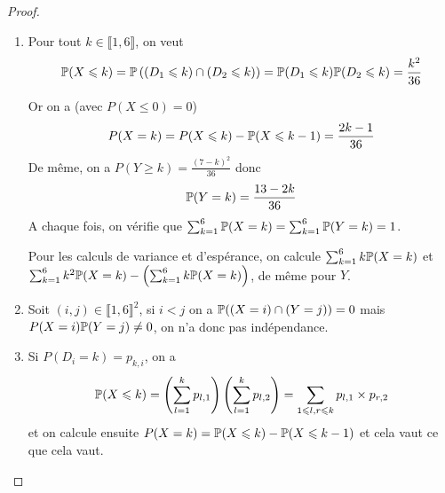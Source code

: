 \begin{proof}
    \phantom{}
    \begin{enumerate}
        \item Pour tout $k\in\llbracket1,6\rrbracket$, on veut
        \begin{equation}
            \P(X\leqslant k)=\P\left(\left(D_{1}\leqslant k\right)\cap\left(D_{2}\leqslant k\right)\right)=\P(D_{1}\leqslant k)\P(D_{2}\leqslant k)=\frac{k^{2}}{36}
        \end{equation}

        Or on a (avec $P(X\leqslant 0)=0$)
        \begin{equation}
            P(X=k)=P(X\leqslant k)-\P(X\leqslant k-1)=\frac{2k-1}{36}
        \end{equation}
        De même, on a $P(Y\geqslant k)=\frac{(7-k)^{2}}{36}$ donc
        \begin{equation}
            \P(Y=k)=\frac{13-2k}{36}
        \end{equation}
        A chaque fois, on vérifie que $\sum_{k=1}^{6}\P(X=k)=\sum_{k=1}^{6}\P(Y=k)=1$.

        Pour les calculs de variance et d'espérance, on calcule $\sum_{k=1}^{6}k\P(X=k)$ et $\sum_{k=1}^{6}k^{2}\P(X=k)-\left(\sum_{k=1}^{6}k\P(X=k)\right)$, de même pour $Y$.

        \item Soit $(i,j)\in\llbracket1,6\rrbracket^{2}$, si $i<j$ on a $\P((X=i)\cap (Y=j))=0$ mais $P(X=i)\P(Y=j)\neq0$, on n'a donc pas indépendance.
        
        \item Si $P(D_{i}=k)=p_{k,i}$, on a 
        \begin{equation}
            \P(X\leqslant k)=\left(\sum_{l=1}^{k}p_{l,1}\right)\left(\sum_{l=1}^{k}p_{l,2}\right)=\sum_{1\leqslant l,r\leqslant k}p_{l,1}\times p_{r,2}
        \end{equation}
        et on calcule ensuite $P(X=k)=\P(X\leqslant k)-\P(X\leqslant k-1)$ et cela vaut ce que cela vaut.
    \end{enumerate}
\end{proof}

